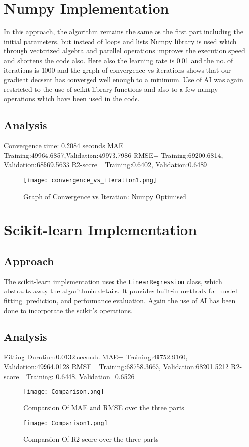 \documentclass[12pt]{article}
\begin{document}
\section{Numpy Implementation}
In this approach, the algorithm remains the same as the first part including the initial parameters, but instead of loops and lists Numpy library is used which through vectorized algebra and parallel operations improves the execution speed and shortens the code also.
Here also the learning rate is 0.01 and the no. of iterations is 1000 and the graph of convergence vs iterations shows that our gradient decsent has converged well enough to a minimum.
Use of AI was again restricted to the use of scikit-library functions and also to a few numpy operations which have been used in the code.
\subsection{Analysis}
Convergence time: 0.2084 seconds
MAE= Training:49964.6857,Validation:49973.7986
RMSE= Training:69200.6814, Validation:68569.5633
R2-score= Training:0.6402, Validation:0.6489
\begin{figure}[h]
    \centering
    \texttt{[image: convergence\_vs\_iteration1.png]}
    \caption{Graph of Convergence vs Iteration: Numpy Optimised}
    \label{fig:Convergence vs Iteration}
\end{figure}
\section{Scikit-learn Implementation}
\subsection{Approach}
The scikit-learn implementation uses the \texttt{LinearRegression} class, which abstracts away the algorithmic details. It provides built-in methods for model fitting, prediction, and performance evaluation.
Again the use of AI has been done to incorporate the scikit's operations.

\subsection{Analysis}
Fitting Duration:0.0132 seconds
MAE= Training:49752.9160, Validation:49964.0128
RMSE= Training:68758.3663, Validation:68201.5212
R2-score= Training: 0.6448, Validation=0.6526
\begin{figure}[h]
    \centering
    \texttt{[image: Comparison.png]}
    \caption{Comparsion Of MAE and RMSE over the three parts}
    \label{fig:Regression Metrics MAE and RMSE}
\end{figure}
\begin{figure}[h]
    \centering
    \texttt{[image: Comparison1.png]}
    \caption{Comparsion Of R2 score over the three parts}
    \label{fig:Regression Metrics R2}
\end{figure}
\end{document}
